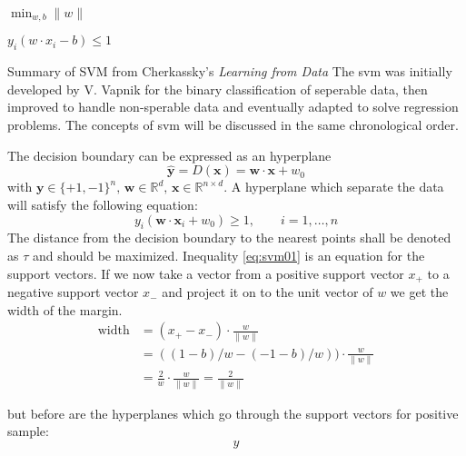 $\min_{w,b} \|w\|$ 

$ y_i(w \cdot x_i - b)\leqslant 1$ 

Summary of SVM from Cherkassky's \textit{Learning from Data}\cite{cherkassky1998learning}
The \gls{svm} was initially developed by V. Vapnik for the binary classification of seperable data, then improved to handle non-sperable data and eventually adapted to solve regression problems.
The concepts of \gls{svm} will be discussed in the same chronological order. 

The decision boundary can be expressed as an hyperplane
\begin{equation}
	\hat{\mathbf{y}} = D(\mathbf{x}) = \mathbf{w} \cdot \mathbf{x} + w_0 
\end{equation}
with $
\mathbf{y} \in \lbrace +1, -1 \rbrace^n ,\,
\mathbf{w} \in \mathbb{R}^d ,\,
\mathbf{x} \in \mathbb{R}^{n \times d} 
$.
A hyperplane which separate the data will satisfy the following equation: 
\begin{equation}
	\label{eq:svm01}
	y_i(\mathbf{w} \cdot \mathbf{x}_i + w_0 ) \geqslant 1, \qquad i=1,\dots,n
\end{equation}
The distance from the decision boundary to the nearest points shall be denoted as $\tau$ and should be maximized. 
Inequality \ref{eq:svm01} is an equation for the support vectors. 
If we now take a vector from a positive support vector $x_+$ to a negative support vector $x_-$ and project it on to the unit vector of $w$ we get the width of the margin. 
\begin{equation}
	\label{eq:svm02}
\begin{aligned} 
	\text{width} &= (x_+ - x_-) \cdot \frac{w}{\|w\|} \\
		&= ( (1-b)/w - (-1-b)/w ) ) \cdot \frac{w}{\|w\|} \\
		&= \frac{2}{w} \cdot \frac{w}{\|w\|} = \frac{2}{\|w\|}
\end{aligned}
\end{equation}

but before are the hyperplanes which go through the support vectors for positive sample: 
\begin{equation}
	y
\end{equation}

